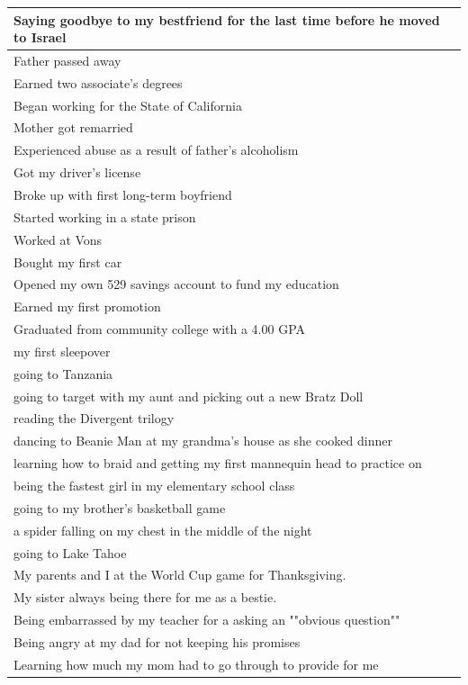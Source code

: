 \documentclass[
  .7em,
  letterpaper,
  DIV=11,
  numbers=noendperiod]{scrartcl}
\begin{document}
\begin{table}
\begin{tabular}{l}
\hline
Saying goodbye to my bestfriend for the last time before he moved to Israel\\
\hline
Father passed away\\
\hline
Earned two associate's degrees\\
\hline
Began working for the State of California\\
\hline
Mother got remarried\\
\hline
Experienced abuse as a result of father's alcoholism\\
\hline
Got my driver's license\\
\hline
Broke up with first long-term boyfriend\\
\hline
Started working in a state prison\\
\hline
Worked at Vons\\
\hline
Bought my first car\\
\hline
Opened my own 529 savings account to fund my education\\
\hline
Earned my first promotion\\
\hline
Graduated from community college with a 4.00 GPA\\
\hline
my first sleepover\\
\hline
going to Tanzania\\
\hline
going to target with my aunt and picking out a new Bratz Doll\\
\hline
reading the Divergent trilogy\\
\hline
dancing to Beanie Man at my grandma's house as she cooked dinner\\
\hline
learning how to braid and getting my first mannequin head to practice on\\
\hline
being the fastest girl in my elementary school class\\
\hline
going to my brother's basketball game\\
\hline
a spider falling on my chest in the middle of the night\\
\hline
going to Lake Tahoe\\
\hline
My parents and I at the World Cup game for Thanksgiving.\\
\hline
My sister always being there for me as a bestie.\\
\hline
Being embarrassed by my teacher for a asking an ""obvious question""\\
\hline
Being angry at my dad for not keeping his promises\\
\hline
Learning how much my mom had to go through to provide for me\\

\end{tabular}
\end{table}
\end{document}
